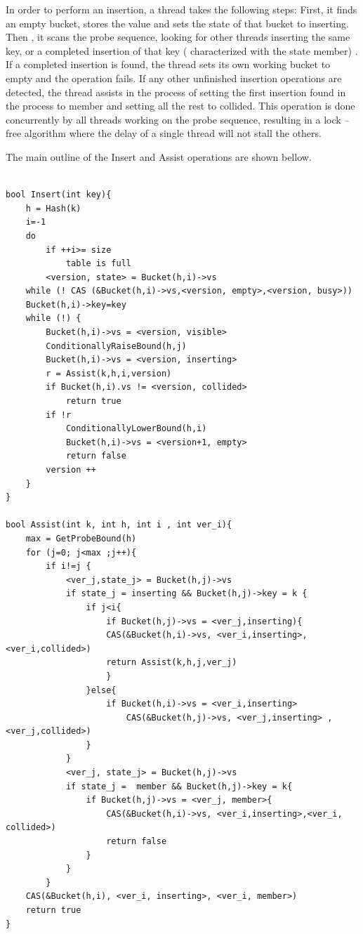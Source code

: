 In order to perform an insertion, a thread takes the following steps: First, it finds an empty bucket, stores the value and sets the state of that bucket to inserting. Then , it scans the probe sequence, looking for other threads inserting the same key, or a completed insertion of that key  ( characterized with the state member) . If a completed insertion is found, the thread sets its own working bucket to empty and the operation fails. If any other unfinished insertion operations are detected, the thread assists in the process of setting the first insertion found in the process to member and setting all the rest to collided. This operation is done concurrently by all threads working on the probe sequence, resulting in a lock –free algorithm where the delay of a single thread will not stall the others.

The main outline of the Insert and Assist operations are shown bellow.

\begin{lstlisting}

bool Insert(int key){
	h = Hash(k)
	i=-1
	do
		if ++i>= size 
			table is full
		<version, state> = Bucket(h,i)->vs
	while (! CAS (&Bucket(h,i)->vs,<version, empty>,<version, busy>))
	Bucket(h,i)->key=key
	while (!) {
		Bucket(h,i)->vs = <version, visible>
		ConditionallyRaiseBound(h,j)
		Bucket(h,i)->vs = <version, inserting>
		r = Assist(k,h,i,version)
		if Bucket(h,i).vs != <version, collided>
			return true
		if !r
			ConditionallyLowerBound(h,i)
			Bucket(h,i)->vs = <version+1, empty>
			return false
		version ++
	}
}

bool Assist(int k, int h, int i , int ver_i){
	max = GetProbeBound(h)
	for (j=0; j<max ;j++){
		if i!=j {
			<ver_j,state_j> = Bucket(h,j)->vs
			if state_j = inserting && Bucket(h,j)->key = k {
				if j<i{
					if Bucket(h,j)->vs = <ver_j,inserting){
					CAS(&Bucket(h,i)->vs, <ver_i,inserting>, <ver_i,collided>)
					return Assist(k,h,j,ver_j)
					}
				}else{
					if Bucket(h,i)->vs = <ver_i,inserting>
						CAS(&Bucket(h,j)->vs, <ver_j,inserting> ,<ver_j,collided>)
				}
			}
			<ver_j, state_j> = Bucket(h,j)->vs
			if state_j =  member && Bucket(h,j)->key = k{
				if Bucket(h,j)->vs = <ver_j, member>{
					CAS(&Bucket(h,i)->vs, <ver_i,inserting>,<ver_i, collided>)
					return false
				}
			}
		}
	CAS(&Bucket(h,i), <ver_i, inserting>, <ver_i, member>)
	return true
}

					
						
\end{lstlisting}

